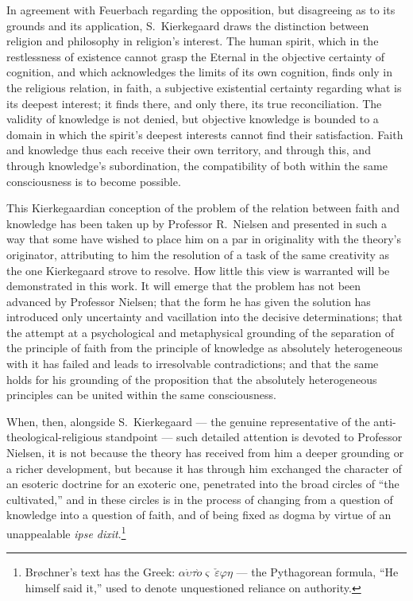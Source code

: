 \documentclass[12pt,a4paper]{article}
\begin{document}
In agreement with Feuerbach regarding the opposition, but disagreeing
as to its grounds and its application, S.\ Kierkegaard draws the
distinction between religion and philosophy in religion's interest.
The human spirit, which in the restlessness of existence cannot grasp
the Eternal in the objective certainty of cognition, and which
acknowledges the limits of its own cognition, finds only in the
religious relation, in faith, a subjective existential certainty
regarding what is its deepest interest; it finds there, and only
there, its true reconciliation. The validity of knowledge is not
denied, but objective knowledge is bounded to a domain in which the
spirit's deepest interests cannot find their satisfaction. Faith and
knowledge thus each receive their own territory, and through this, and
through knowledge's subordination, the compatibility of both within
the same consciousness is to become possible.

This Kierkegaardian conception of the problem of the relation between
faith and knowledge has been taken up by Professor R.\ Nielsen and
presented in such a way that some have wished to place him on a par in
originality with the theory's originator, attributing to him the
resolution of a task of the same creativity as the one Kierkegaard
strove to resolve. How little this view is warranted will be
demonstrated in this work. It will emerge that the problem has not
been advanced by Professor Nielsen; that the form he has given the
solution has introduced only uncertainty and vacillation into the
decisive determinations; that the attempt at a psychological and
metaphysical grounding of the separation of the principle of faith
from the principle of knowledge as absolutely heterogeneous with it
has failed and leads to irresolvable contradictions; and that the same
holds for his grounding of the proposition that the absolutely
heterogeneous principles can be united within the same consciousness.

When, then, alongside S.\ Kierkegaard --- the genuine representative
of the anti-theological-religious standpoint --- such detailed
attention is devoted to Professor Nielsen, it is not because the
theory has received from him a deeper grounding or a richer
development, but because it has through him exchanged the character of
an esoteric doctrine for an exoteric one, penetrated into the broad
circles of ``the cultivated,'' and in these circles is in the process
of changing from a question of knowledge into a question of faith, and
of being fixed as dogma by virtue of an unappealable
\textit{ipse dixit}.\footnote{Brøchner's text has the Greek:
$\alpha\dot{\upsilon}\tau\grave{o}\varsigma\ \check{\varepsilon}\varphi\eta$
--- the Pythagorean formula, ``He himself said it,'' used to denote
unquestioned reliance on authority.}
\end{document}
